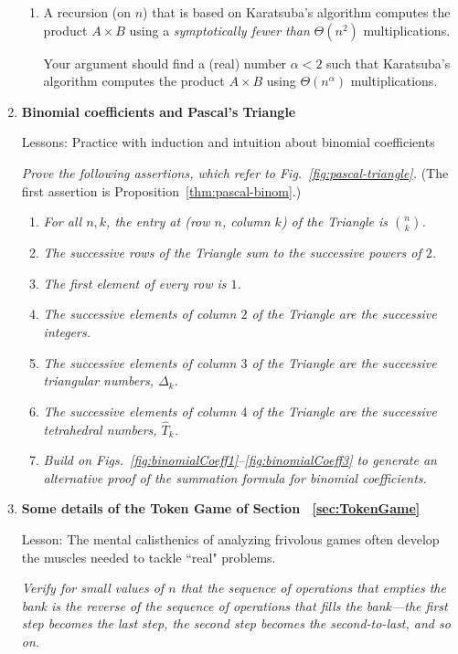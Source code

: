\begin{enumerate}
{\begin{enumerate}
\item
A recursion (on $n$) that is based on Karatsuba's algorithm computes the product $A \times B$ using a {\em symptotically fewer than} $\Theta(n^2)$ multiplications.

\smallskip

Your argument should find a (real) number $\alpha < 2$ such that Karatsuba's algorithm computes the product $A \times B$ using $\Theta(n^\alpha)$ multiplications.
\end{enumerate}
}

\item
{\bf Binomial coefficients and Pascal's Triangle}

{\sc Lessons:}
Practice with induction and intuition about binomial coefficients

\smallskip

{\em  Prove the following assertions, which refer to Fig.~\ref{fig:pascal-triangle}.} (The first assertion is Proposition~\ref{thm:pascal-binom}.)
  \begin{enumerate}
  \item
{\em For all $n,k$, the entry at (row $n$, column $k$) of the Triangle is $\displaystyle {n \choose k}$.}
  
  \item
{\em The successive rows of the Triangle sum to the successive powers of $2$.}

  \item
{\em The first element of every row is $1$.}

  \item
{\em The successive elements of column $2$ of the Triangle are the successive integers.}

  \item
{\em The successive elements of column $3$ of the Triangle are the successive triangular numbers, $\Delta_k$.}

  \item
{\em The successive elements of column $4$ of the Triangle are the successive tetrahedral numbers, $\widehat{T}_k$.}
  
  \item
{\em Build on Figs.~\ref{fig:binomialCoeff1}--\ref{fig:binomialCoeff3} to generate an alternative proof of the summation formula for binomial coefficients.}
  \end{enumerate}

\item
{\bf Some details of the Token Game of Section ~\ref{sec:TokenGame}}

{\sc Lesson:}  The mental calisthenics of analyzing frivolous games often develop the muscles needed to tackle ``real" problems.

\smallskip

{\em Verify for small values of $n$ that the sequence of operations that empties the bank is the reverse of the sequence of operations that fills the bank---the first step becomes the last step, the second step becomes the second-to-last, and so on.}
\end{enumerate}


